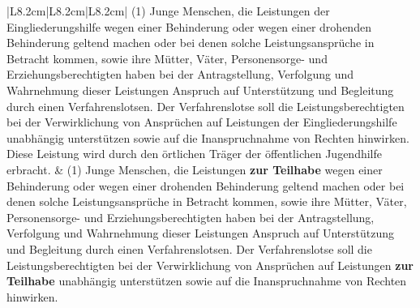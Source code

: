 \documentclass[10pt,a4paper,landscape]{article}
\begin{document}
\begin{longtable}{|L{8.2cm}|L{8.2cm}|L{8.2cm}|}
(1) Junge Menschen, die Leistungen \textcolor{diffred}{der  \newline Eingliederungshilfe} wegen einer  \newline Behinderung oder wegen einer drohenden  \newline Behinderung geltend machen oder bei  \newline denen solche Leistungsansprüche in  \newline Betracht kommen, sowie ihre Mütter, Väter,  \newline Personensorge- und  \newline Erziehungsberechtigten haben bei der  \newline Antragstellung, Verfolgung und  \newline Wahrnehmung dieser Leistungen Anspruch  \newline auf Unterstützung und Begleitung durch  \newline einen Verfahrenslotsen. Der  \newline Verfahrenslotse soll die  \newline Leistungsberechtigten bei der  \newline Verwirklichung von Ansprüchen auf  \newline Leistungen \textcolor{diffred}{der Eingliederungshilfe  \newline unabhängig} unterstützen sowie auf die  \newline Inanspruchnahme von Rechten hinwirken.  \newline \textcolor{diffred}{Diese} Leistung wird durch den örtlichen  \newline Träger der öffentlichen Jugendhilfe  \newline erbracht. & (1) Junge Menschen, die Leistungen \textbf{zur  \newline Teilhabe }wegen einer Behinderung oder  \newline wegen einer drohenden Behinderung  \newline geltend machen oder bei denen solche  \newline Leistungsansprüche in Betracht kommen,  \newline sowie ihre Mütter, Väter, Personensorge-  \newline und Erziehungsberechtigten haben bei der  \newline Antragstellung, Verfolgung und  \newline Wahrnehmung dieser Leistungen Anspruch  \newline auf Unterstützung und Begleitung durch  \newline einen Verfahrenslotsen. Der  \newline Verfahrenslotse soll die  \newline Leistungsberechtigten bei der  \newline Verwirklichung von Ansprüchen auf  \newline Leistungen \textbf{zur Teilhabe} \textcolor{diffred}{unabhängig}  \newline unterstützen sowie auf die  \newline Inanspruchnahme von Rechten hinwirken. 
\end{longtable}
\end{document}
